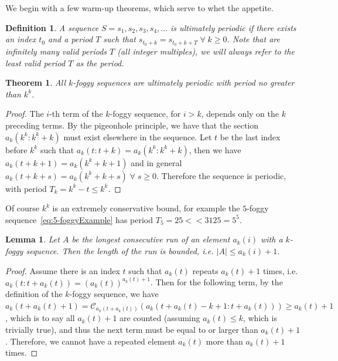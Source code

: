 \documentclass{article}
\newtheorem{theorem}{Theorem}
\newtheorem{lemma}{Lemma}
\newtheorem{definition}{Definition}
\begin{document}
We begin with a few warm-up theorems, which serve to whet the appetite. 

\begin{definition}\label{def:ultimatelyPeriodic}
A sequence $S = s_1,s_2,s_3,s_4,...$ is ultimately periodic if there exists an index $t_0$ and a period $T$ such that $s_{t_0+k} = s_{t_0+k+T} \; \forall \; k \geq 0$. Note that are infinitely many valid periods $T$ (all integer multiples), we will always refer to the \emph{least} valid period $T$ as the period.
\end{definition}



\begin{theorem}\label{thm:allSequencesRepeat}
All $k$-foggy sequences are ultimately periodic with period no greater than $k^k$. 
\end{theorem}

\begin{proof}
The $i$-th term of the $k$-foggy sequence, for $i>k$, depends only on the $k$ preceding terms. By the pigeonhole principle, we have that the section $a_k(k^k : k^k+k)$ must exist elsewhere in the sequence. Let $t$ be the last index before $k^k$ such that $a_k(t:t+k) = a_k(k^k:k^k+k)$, then we have $a_k(t+k+1) = a_k(k^k+k+1)$ and in general $a_k(t+k+s) = a_k(k^k+k+s) \; \forall \; s \geq 0$. Therefore the sequence is periodic, with period $T_k= k^k - t \leq k^k$.
\end{proof}

Of course $k^k$ is an extremely conservative bound, for example the $5$-foggy sequence~\eqref{eq:5-foggyExample} has period $T_5 = 25 << 3125 = 5^5$.

\begin{lemma}\label{lem:longestRun}
Let $A$ be the longest consecutive run of an element $a_k(i)$ with a $k$-foggy sequence. Then the length of the run is bounded, i.e. $|A| \leq a_k(i) + 1$.
\end{lemma}

\begin{proof}
Assume there is an index $t$ such that $a_k(t)$ repeats $a_k(t) + 1$ times, i.e. $a_k(t:t+a_k(t)) = (a_k(t))^{a_k(t)+1}$. Then for the following term, by the definition of the $k$-foggy sequence, we have $a_k(t+a_k(t)+1)=\mathcal{C}_{a_k(t+a_k(t))}(a_k(t+a_k(t)-k+1:t+a_k(t))) \geq a_k(t)+1$, which is to say all $a_k(t) + 1$ are counted (assuming $a_k(t) \leq k$, which is trivially true), and thus the next term must be equal to or larger than $a_k(t) + 1$.  Therefore, we cannot have a repeated element $a_k(t)$ more than $a_k(t)+1$ times.
\end{proof}
\end{document}
